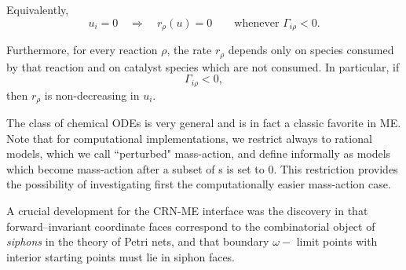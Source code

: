 Equivalently,
\[
u_i=0
\quad\Longrightarrow\quad
r_\rho(u)=0
\qquad
\text{whenever }\Gamma_{i\rho}<0.
\]

Furthermore, for every reaction $\rho$, the rate $r_\rho$ depends only
on species consumed by that reaction and on catalyst species which are
not consumed.  In particular, if
\[
\Gamma_{i\rho}<0,
\]
then $r_\rho$ is non-decreasing in $u_i$.

\eeD



The class of chemical ODEs is very general and is in fact a classic favorite in ME.
Note that for computational implementations, we restrict always  to rational models, which we call ``perturbed" mass-action, and define informally as models which become mass-action after a subset of \para s is set to $0$.  This restriction provides the possibility of investigating first the   computationally easier mass-action case.



A crucial development for the CRN-ME interface was the discovery in \cite{AdLS}
that forward--invariant coordinate faces  correspond to the combinatorial object of  \emph{siphons}  in the theory of Petri nets, and that boundary $\omega-$ limit points with interior starting points must lie in siphon  faces.





